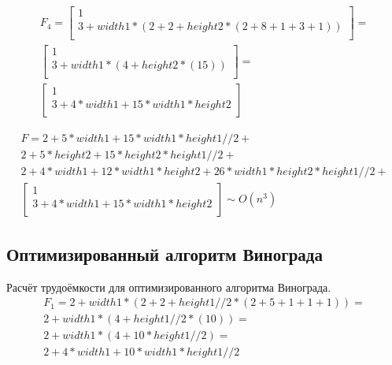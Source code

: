 \documentclass[a4paper,12pt]{report}
\begin{document}
			\begin{multline*}
				F_{4} = 
				\left[ 
					\begin{gathered} 
						1\\
						3+width1*(2+2+height2*(2+8+1+3+1))\\ 
			 		\end{gathered} 
		 		\right] =\\
		 		\left[ 
		 			\begin{gathered} 
		 				1\\
		 				3+width1*(4+height2*(15))\\ 
		 			\end{gathered} 
		 		\right] =\\
		 		\left[ 
		 			\begin{gathered} 
		 				1\\
		 				3+4*width1+15*width1*height2\\ 
		 			\end{gathered} 
		 		\right]
	 		\end{multline*}
	 		
	 		\begin{multline*}
	 			F = 2+5*width1+15*width1*height1//2+\\
	 			2+5*height2+15*height2*height1//2+\\
	 			2+4*width1+12*width1*height2+26*width1*height2*height1//2+\\
	 			\left[ 
	 				\begin{gathered} 
	 					1\\
	 					3+4*width1+15*width1*height2\\ 
	 				\end{gathered} 
	 			\right] \sim O(n^{3})
	 		\end{multline*}
	 		
	\newpage
	 		
    \subsection{Оптимизированный алгоритм Винограда}

        	Расчёт трудоёмкости для оптимизированного алгоритма Винограда.
        	\begin{multline*}
        		F_{1} = 2+width1*(2+2+height1//2*(2+5+1+1+1)) = \\2+width1*(4+height1//2*(10)) =\\ 2+width1*(4+10*height1//2) =\\ 2+4*width1+10*width1*height1//2
        	\end{multline*}
        	
\end{document}
